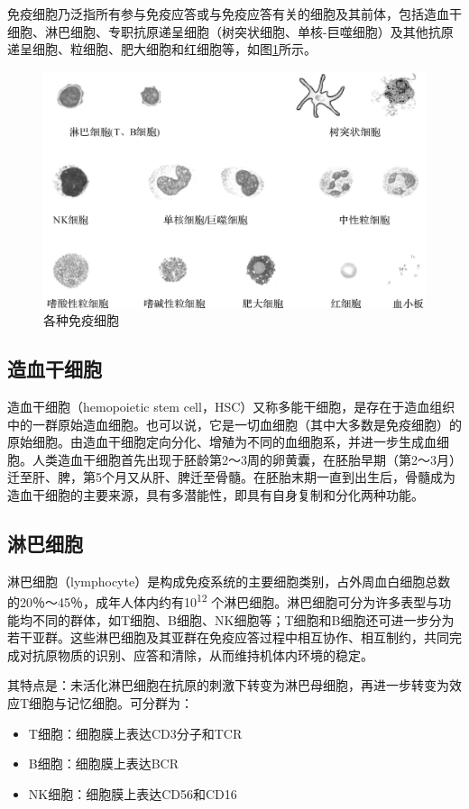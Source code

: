 免疫细胞乃泛指所有参与免疫应答或与免疫应答有关的细胞及其前体，包括造血干细胞、淋巴细胞、专职抗原递呈细胞（树突状细胞、单核-巨噬细胞）及其他抗原递呈细胞、粒细胞、肥大细胞和红细胞等，如图\ref{fig2-13}所示。

\begin{figure}[!htbp]
 \centering
 \includegraphics[width=.6\textwidth]{./images/Image00038.jpg}
 \caption{各种免疫细胞}
 \label{fig2-13}
  \end{figure} 


\subsection{造血干细胞}

造血干细胞（hemopoietic stem
cell，HSC）又称多能干细胞，是存在于造血组织中的一群原始造血细胞。也可以说，它是一切血细胞（其中大多数是免疫细胞）的原始细胞。由造血干细胞定向分化、增殖为不同的血细胞系，并进一步生成血细胞。人类造血干细胞首先出现于胚龄第2～3周的卵黄囊，在胚胎早期（第2～3月）迁至肝、脾，第5个月又从肝、脾迁至骨髓。在胚胎末期一直到出生后，骨髓成为造血干细胞的主要来源，具有多潜能性，即具有自身复制和分化两种功能。


\subsection{淋巴细胞}

淋巴细胞（lymphocyte）是构成免疫系统的主要细胞类别，占外周血白细胞总数的20％～45％，成年人体内约有10\textsuperscript{12}
个淋巴细胞。淋巴细胞可分为许多表型与功能均不同的群体，如T细胞、B细胞、NK细胞等；T细胞和B细胞还可进一步分为若干亚群。这些淋巴细胞及其亚群在免疫应答过程中相互协作、相互制约，共同完成对抗原物质的识别、应答和清除，从而维持机体内环境的稳定。

其特点是：未活化淋巴细胞在抗原的刺激下转变为淋巴母细胞，再进一步转变为效应T细胞与记忆细胞。可分群为：
\begin{itemize}
\item T细胞：细胞膜上表达CD3分子和TCR
\item B细胞：细胞膜上表达BCR
\item NK细胞：细胞膜上表达CD56和CD16
\end{itemize}

